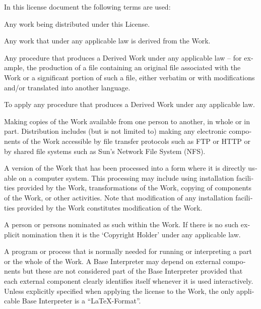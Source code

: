 \begin{otherlanguage}{english}
In this license document the following terms are used:
\begin {description}\def\Item[#1]{\item[\textit{#1}]}
\Item[Work]
    Any work being distributed under this License.

\Item[Derived Work]
    Any work that under any applicable law is derived from the Work.

\Item[Modification]
    Any procedure that produces a Derived Work under any applicable
    law -- for example, the production of a file containing an
    original file associated with the Work or a significant portion of
    such a file, either verbatim or with modifications and/or
    translated into another language.

\Item[Modify]
    To apply any procedure that produces a Derived Work under any
    applicable law.

\Item[Distribution]
    Making copies of the Work available from one person to another, in
    whole or in part.  Distribution includes (but is not limited to)
    making any electronic components of the Work accessible by
    file transfer protocols such as FTP or HTTP or by shared file
    systems such as Sun's Network File System (NFS).

\Item[Compiled Work]
    A version of the Work that has been processed into a form where it
    is directly usable on a computer system.  This processing may
    include using installation facilities provided by the Work,
    transformations of the Work, copying of components of the Work, or
    other activities.  Note that modification of any installation
    facilities provided by the Work constitutes modification of the Work.

\Item[Current Maintainer]
    A person or persons nominated as such within the Work.  If there is
    no such explicit nomination then it is the `Copyright Holder' under
    any applicable law.

\Item[Base Interpreter]
    A program or process that is normally needed for running or
    interpreting a part or the whole of the Work.
    A Base Interpreter may depend on external components but these
    are not considered part of the Base Interpreter provided that each
    external component clearly identifies itself whenever it is used
    interactively.  Unless explicitly specified when applying the
    license to the Work, the only applicable Base Interpreter is a
    ``\LaTeX-Format''.
\end{description}



\end{otherlanguage}
